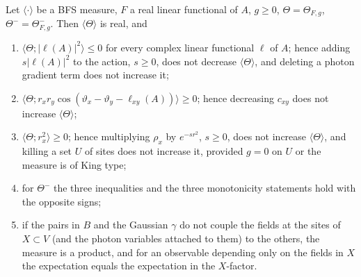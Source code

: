 \begin{lemma}\label{lem:s02:BFS}
Let $\langle\cdot\rangle$ be a BFS measure, $F$ a real linear functional of $A$, $g\ge0$, $\Theta=\Theta_{F,g}$, $\Theta^-=\Theta^-_{F,g}$. Then $\langle\Theta\rangle$ is real, and
\begin{enumerate}[label=\textup{(\alph*)},nosep]
\item $\langle\Theta;|\ell(A)|^2\rangle\le0$ for every complex linear functional $\ell$ of $A$; hence adding $s|\ell(A)|^2$ to the action, $s\ge0$, does not decrease $\langle\Theta\rangle$, and deleting a photon gradient term does not increase it;
\item $\langle\Theta;r_xr_y\cos(\vartheta_x-\vartheta_y-\ell_{xy}(A))\rangle\ge0$; hence decreasing $c_{xy}$ does not increase $\langle\Theta\rangle$;
\item $\langle\Theta;r_x^2\rangle\ge0$; hence multiplying $\rho_x$ by $e^{-sr^2}$, $s\ge0$, does not increase $\langle\Theta\rangle$, and killing a set $U$ of sites does not increase it, provided $g=0$ on $U$ or the measure is of King type;
\item for $\Theta^-$ the three inequalities and the three monotonicity statements hold with the opposite signs;
\item if the pairs in $B$ and the Gaussian $\gamma$ do not couple the fields at the sites of $X\subset V$ (and the photon variables attached to them) to the others, the measure is a product, and for an observable depending only on the fields in $X$ the expectation equals the expectation in the $X$-factor.
\end{enumerate}
\end{lemma}

